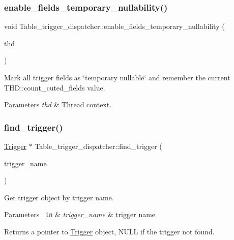 \subsubsection{\texorpdfstring{enable\+\_\+fields\+\_\+temporary\+\_\+nullability()}{enable\_fields\_temporary\_nullability()}}
{\footnotesize\ttfamily void Table\+\_\+trigger\+\_\+dispatcher\+::enable\+\_\+fields\+\_\+temporary\+\_\+nullability (\begin{DoxyParamCaption}\item[{T\+HD $\ast$}]{thd }\end{DoxyParamCaption})}

Mark all trigger fields as \char`\"{}temporary nullable\char`\"{} and remember the current T\+H\+D\+::count\+\_\+cuted\+\_\+fields value.


\begin{DoxyParams}{Parameters}
{\em thd} & Thread context. \\
\hline
\end{DoxyParams}
\mbox{\label{classTable__trigger__dispatcher_a4e5577ae97ad916d06595957f4624482}} 
\subsubsection{\texorpdfstring{find\+\_\+trigger()}{find\_trigger()}}
{\footnotesize\ttfamily \mbox{\hyperlink{classTrigger}{Trigger}} $\ast$ Table\+\_\+trigger\+\_\+dispatcher\+::find\+\_\+trigger (\begin{DoxyParamCaption}\item[{const L\+E\+X\+\_\+\+S\+T\+R\+I\+NG \&}]{trigger\+\_\+name }\end{DoxyParamCaption})}

Get trigger object by trigger name.


\begin{DoxyParams}[1]{Parameters}
\mbox{\texttt{ in}}  & {\em trigger\+\_\+name} & trigger name\\
\hline
\end{DoxyParams}
\begin{DoxyReturn}{Returns}
a pointer to \mbox{\hyperlink{classTrigger}{Trigger}} object, N\+U\+LL if the trigger not found. 
\end{DoxyReturn}
\mbox{\label{classTable__trigger__dispatcher_a644865f63c596311fc869e5b7c0d43e6}} 
